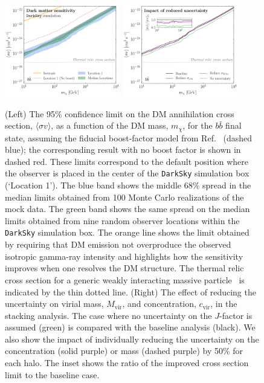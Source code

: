 \begin{figure}[t]
   \centering
   \includegraphics[width=0.45\textwidth]{ch-darksky/plots//darksky_limits.pdf} 
   \includegraphics[width=0.45\textwidth]{ch-darksky/plots//darksky_reduced_err.pdf} 
   \caption{(Left) The 95\% confidence limit on the DM annihilation cross section, $\langle \sigma v \rangle$, as a function of the DM mass, $m_\chi$, for the $b\bar{b}$ final state, assuming the fiducial boost-factor model from Ref.~\cite{Bartels:2015uba} (dashed blue); the corresponding result with no boost factor is shown in dashed red.  These limits correspond to the default position where the observer is placed in the center of the \texttt{DarkSky} simulation box (`Location 1').  The blue band shows the middle 68\% spread in the median limits obtained from 100 Monte Carlo realizations of the mock data.  The green band shows the same spread on the median limits obtained from nine random observer locations within the \texttt{DarkSky} simulation box.  The orange line shows the limit obtained by requiring that DM emission not overproduce the observed isotropic gamma-ray intensity and highlights how the sensitivity improves when one resolves the DM structure.  The thermal relic cross section for a generic weakly interacting massive particle~\cite{Steigman:2012nb} is indicated by the thin dotted line. (Right) The effect of reducing the uncertainty on virial mass, $M_\text{vir}$, and concentration, $c_\text{vir}$, in the stacking analysis.  The case where no uncertainty on the $J$-factor is assumed (green) is compared with the baseline analysis (black). We also show the impact of individually reducing the uncertainty on the concentration (solid purple) or mass (dashed purple) by 50\% for each halo. The inset shows the ratio of the improved cross section limit to the baseline case.}
   \label{fig:DSLimits}
\end{figure}

